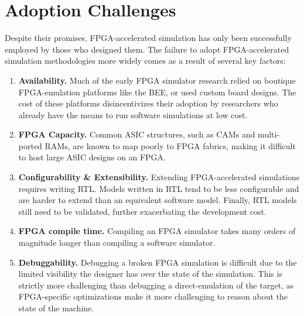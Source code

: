 \section{Adoption Challenges}

Despite their promises, FPGA-accelerated simulation has only been successfully employed by
those who designed them. The failure to adopt FPGA-accelerated simulation
methodologies more widely comes as a result of several key factors:

\begin{enumerate}

    \item \textbf{Availability.} Much of the early FPGA simulator research
        relied on boutique FPGA-emulation platforms like the BEE\cite{bee2}, or
        used custom board designs. The cost of these platforms disincentivizes
        their adoption by researchers who already have the means to run
        software simulations at low cost.

    \item \textbf{FPGA Capacity.} Common ASIC structures, such as CAMs and
        multi-ported RAMs, are known to map poorly to FPGA
        fabrics\cite{fpgagap, fpgagap2}, making it difficult to host large ASIC
        designs on an FPGA.

    \item \textbf{Configurability \& Extensibility.} Extending FPGA-accelerated
        simulations requires writing RTL. Models written in RTL tend to be less
        configurable and are harder to extend than an equivalent software
        model. Finally, RTL models still need to be validated, further
        exacerbating the development cost.

    \item \textbf{FPGA compile time.} Compiling an FPGA simulator takes many
        orders of magnitude longer than compiling a software simulator.

    \item \textbf{Debuggability.} Debugging a broken FPGA simulation is
        difficult due to the limited visibility the designer has over the state
        of the simulation. This is strictly more challenging than debugging a
        direct-emulation of the target, as FPGA-specific optimizations make it more
        challenging to reason about the state of the machine.

\end{enumerate}

